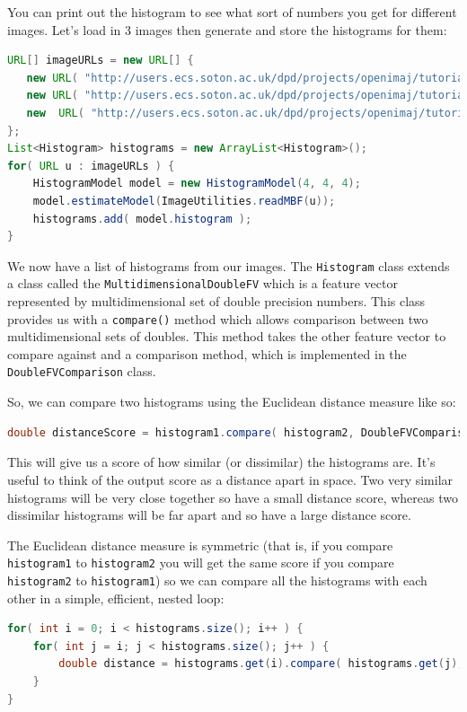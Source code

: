 \documentclass[10pt,a4paper,twoside,extrafontsizes]{memoir}
\begin{document}
You can print out the histogram to see what sort of numbers you get for different images. 
Let's load in 3 images then generate and store the histograms for them:
\begin{lstlisting}[language=java]
URL[] imageURLs = new URL[] {
   new URL( "http://users.ecs.soton.ac.uk/dpd/projects/openimaj/tutorial/hist1.jpg" ),
   new URL( "http://users.ecs.soton.ac.uk/dpd/projects/openimaj/tutorial/hist2.jpg" ), 
   new  URL( "http://users.ecs.soton.ac.uk/dpd/projects/openimaj/tutorial/hist3.jpg" ) 
};
List<Histogram> histograms = new ArrayList<Histogram>();
for( URL u : imageURLs ) {
    HistogramModel model = new HistogramModel(4, 4, 4);
    model.estimateModel(ImageUtilities.readMBF(u));
    histograms.add( model.histogram );
}
\end{lstlisting}
We now have a list of histograms from our images.  The \verb+Histogram+ class extends a 
class called the \verb+MultidimensionalDoubleFV+ which is a feature vector represented 
by multidimensional set of double precision numbers.  This class provides us with a 
\verb+compare()+ method which allows comparison between two multidimensional sets of 
doubles. This method takes the other feature vector to compare against and a comparison 
method, which is implemented in the \verb+DoubleFVComparison+ class.

So, we can compare two histograms using the Euclidean distance measure like so:
\begin{lstlisting}[language=java]
double distanceScore = histogram1.compare( histogram2, DoubleFVComparison.EUCLIDEAN );
\end{lstlisting}
This will give us a score of how similar (or dissimilar) the histograms are. It's useful
to think of the output score as a distance apart in space. Two very similar histograms 
will be very close together so have a small distance score, whereas two dissimilar 
histograms will be far apart and so have a large distance score.

The Euclidean distance measure is symmetric (that is, if you compare \verb+histogram1+ to 
\verb+histogram2+ you will get the same score if you compare \verb+histogram2+ to 
\verb+histogram1+) so we can compare all the histograms with each other in a simple, 
efficient, nested loop:
\begin{lstlisting}[language=java]
for( int i = 0; i < histograms.size(); i++ ) {
    for( int j = i; j < histograms.size(); j++ ) {
        double distance = histograms.get(i).compare( histograms.get(j), DoubleFVComparison.EUCLIDEAN );
    }
}
\end{lstlisting}
\end{document}
